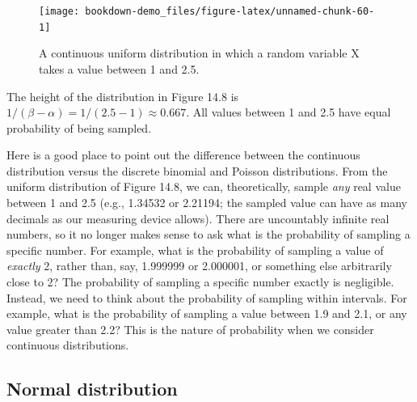 \documentclass[
]{scrbook}
\begin{document}
\begin{figure}
\texttt{[image: bookdown-demo\_files/figure-latex/unnamed-chunk-60-1]} \caption{A continuous uniform distribution in which a random variable X takes a value between 1 and 2.5.}\label{fig:unnamed-chunk-60}
\end{figure}

The height of the distribution in Figure 14.8 is \(1/(\beta - \alpha) = 1/(2.5 - 1) \approx 0.667\).
All values between 1 and 2.5 have equal probability of being sampled.

Here is a good place to point out the difference between the continuous distribution versus the discrete binomial and Poisson distributions.
From the uniform distribution of Figure 14.8, we can, theoretically, sample \emph{any} real value between 1 and 2.5 (e.g., 1.34532 or 2.21194; the sampled value can have as many decimals as our measuring device allows).
There are uncountably infinite real numbers, so it no longer makes sense to ask what is the probability of sampling a specific number.
For example, what is the probability of sampling a value of \emph{exactly} 2, rather than, say, 1.999999 or 2.000001, or something else arbitrarily close to 2?
The probability of sampling a specific number exactly is negligible.
Instead, we need to think about the probability of sampling within intervals.
For example, what is the probability of sampling a value between 1.9 and 2.1, or any value greater than 2.2?
This is the nature of probability when we consider continuous distributions.

\hypertarget{normal-distribution}{%
\subsection{Normal distribution}\label{normal-distribution}}
\end{document}
